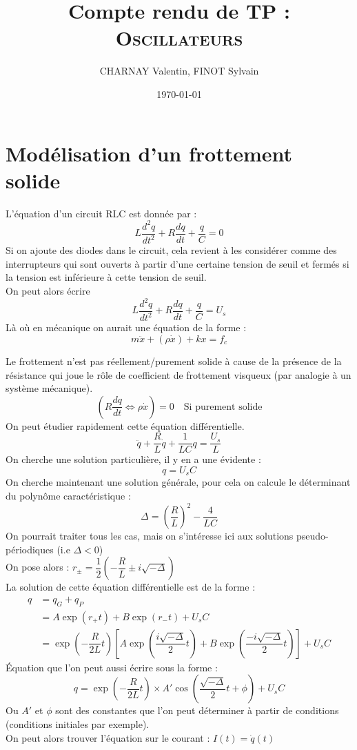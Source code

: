 \documentclass[12pt,a4paper]{article}
\author{CHARNAY Valentin, FINOT Sylvain}
\title{Compte rendu de TP :\\[4pt] \scshape Oscillateurs }
\date{\today}
\begin{document}
	\maketitle
	\section{Modélisation d'un frottement solide}
	L'équation d'un circuit RLC est donnée par :
	$$L\dfrac{d^2q}{dt^2}+R\dfrac{dq}{dt}+\dfrac{q}{C}=0$$
	Si on ajoute des diodes dans le circuit, cela revient à les considérer comme des interrupteurs qui sont ouverts à partir d'une certaine tension de seuil et fermés si la tension est inférieure à cette tension de seuil.\\
	On peut alors écrire
	$$L\dfrac{d^2q}{dt^2}+R\dfrac{dq}{dt}+\dfrac{q}{C}=U_s$$
	Là où en mécanique on aurait une équation de la forme :
	$$m\ddot{x}+(\rho\dot{x})+kx=f_c$$
	
	Le frottement n'est pas réellement/purement solide à cause de la présence de la résistance qui joue le rôle de coefficient de frottement visqueux (par analogie à un système mécanique).
	$$\left( R\dfrac{dq}{dt}\iff\rho\dot{x}\right) = 0 \quad \text{Si purement solide}$$
	On peut étudier rapidement cette équation différentielle.
	\begin{equation*}
	\ddot{q}+\dfrac{R}{L}\dot{q}+\dfrac{1}{LC}q=\dfrac{U_s}{L}
	\end{equation*}
	On cherche une solution particulière, il y en a une évidente : 
	$$q=U_sC$$
	On cherche maintenant une solution générale, pour cela on calcule le déterminant du polynôme caractéristique :
	$$\Delta=\left(\dfrac{R}{L}\right)^2-\dfrac{4}{LC}$$ 
	On pourrait traiter tous les cas, mais on s'intéresse ici aux solutions pseudo-périodiques (i.e $\Delta<0$)\\[4pt]
	On pose alors : $r_{\pm}=\dfrac{1}{2}(-\dfrac{R}{L}\pm i\sqrt{-\Delta})$\\
	La solution de cette équation différentielle est de la forme :
	\begin{align*}
	q &= q_G + q_P\\
	&=A \exp(r_+t)+B\exp(r_-t)+U_sC\\
	&=\exp\left(-\dfrac{R}{2L}t\right)\left[A\exp(\dfrac{i\sqrt{-\Delta}}{2}t)+B\exp(\dfrac{-i\sqrt{-\Delta}}{2}t)\right]+U_sC
	\end{align*}
	Équation que l'on peut aussi écrire sous la forme :
	\begin{equation}
	q=\exp\left(-\dfrac{R}{2L}t\right) \times A' \cos(\dfrac{\sqrt{-\Delta}}{2}t+\phi)+U_sC
	\end{equation}
	Ou $A'$ et $\phi$ sont des constantes que l'on peut déterminer à partir de conditions (conditions initiales par exemple).\\
	On peut alors trouver l'équation sur le courant : $I(t)=\dot{q}(t)$
\end{document}
